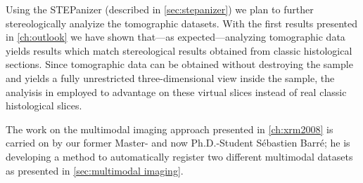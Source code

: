 Using the STEPanizer (described in \autoref{sec:stepanizer}) we plan to further stereologically analyize the tomographic datasets. With the first results presented in \autoref{ch:outlook} we have shown that---as expected---analyzing tomographic data yields results which match stereological results obtained from classic histological sections. Since tomographic data can be obtained without destroying the sample and yields a fully unrestricted three-dimensional view inside the sample, the analyisis in employed to advantage on these virtual slices instead of real classic histological slices.

The work on the multimodal imaging approach presented in \autoref{ch:xrm2008} is carried on by our former Master- and now Ph.D.-Student Sébastien Barré; he is developing a method to automatically register two different multimodal datasets as presented in \autoref{sec:multimodal imaging}.
